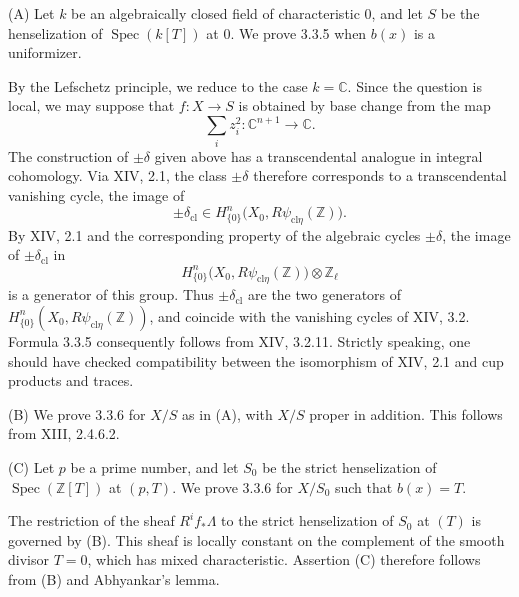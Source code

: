 \medskip
\noindent\textup{(A)}
Let $k$ be an algebraically closed field of characteristic $0$, and
let $S$ be the henselization of $\operatorname{Spec}(k[T])$ at $0$.
We prove 3.3.5 when $b(x)$ is a uniformizer.

By the Lefschetz principle, we reduce to the case $k=\mathbb C$.
Since the question is local, we may suppose that $f:X\to S$ is
obtained by base change from the map
\[
\sum_i z_i^2:\mathbb C^{n+1}\longrightarrow\mathbb C.
\]
The construction of $\pm\delta$ given above has a transcendental
analogue in integral cohomology.  Via XIV, 2.1, the class
$\pm\delta$ therefore corresponds to a transcendental vanishing
cycle, the image of
\[
\pm\delta_{\mathrm{cl}}
\in H^n_{\{0\}}\bigl(X_0,R\psi_{\mathrm{cl}\eta}(\mathbb Z)\bigr).
\]
By XIV, 2.1 and the corresponding property of the algebraic cycles
$\pm\delta$, the image of $\pm\delta_{\mathrm{cl}}$ in
\[
H^n_{\{0\}}\bigl(X_0,R\psi_{\mathrm{cl}\eta}(\mathbb Z)\bigr)
\otimes\mathbb Z_\ell
\]
is a generator of this group.  Thus $\pm\delta_{\mathrm{cl}}$ are the
two generators of
$H^n_{\{0\}}(X_0,R\psi_{\mathrm{cl}\eta}(\mathbb Z))$, and coincide
with the vanishing cycles of XIV, 3.2.  Formula 3.3.5 consequently
follows from XIV, 3.2.11.  Strictly speaking, one should have checked
compatibility between the isomorphism of XIV, 2.1 and cup products
and traces.

\medskip
\noindent\textup{(B)}
We prove 3.3.6 for $X/S$ as in (A), with $X/S$ proper in addition.
This follows from XIII, 2.4.6.2.

\medskip
\noindent\textup{(C)}
Let $p$ be a prime number, and let $S_0$ be the strict henselization
of $\operatorname{Spec}(\mathbb Z[T])$ at $(p,T)$.  We prove 3.3.6
for $X/S_0$ such that $b(x)=T$.

The restriction of the sheaf $R^if_*\Lambda$ to the strict
henselization of $S_0$ at $(T)$ is
governed by (B).  This sheaf is
locally constant on the complement of the smooth divisor $T=0$,
which has mixed characteristic.  Assertion (C) therefore follows
from (B) and Abhyankar's lemma.
